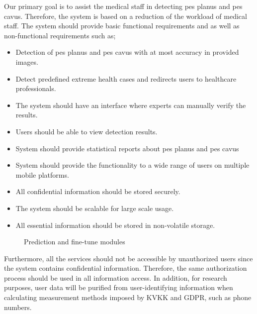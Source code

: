 Our primary goal is to assist the medical staff in detecting pes planus and pes cavus. Therefore, the system is based on a reduction of the workload of medical staff. The system should provide basic functional requirements and as well as non-functional requirements such as;
\begin{itemize}
  \item Detection of pes planus and pes cavus with at most accuracy in provided images.
  \item Detect predefined extreme health cases and redirects users to healthcare professionals.
  \item The system should have an interface where experts can manually verify the results.
  \item Users should be able to view detection results.
  \item System should provide statistical reports about pes planus and pes cavus  
  \item System should provide the functionality to a wide range of users on multiple mobile platforms.
  \item All confidential information should be stored securely.
  \item The system should be scalable for large scale usage.
  \item All essential information should be stored in non-volatile storage.
\end{itemize}

\begin{figure}[htbp]
\centering
{}
\caption{Prediction and fine-tune modules}
\label{fig:PredictionAndFinetuneModules}
\end{figure}

Furthermore, all the services should not be accessible by unauthorized users since the system contains confidential information. Therefore, the same authorization process should be used in all information access. In addition, for research purposes, user data will be purified from user-identifying information when calculating measurement methods imposed by KVKK and GDPR, such as phone numbers.

